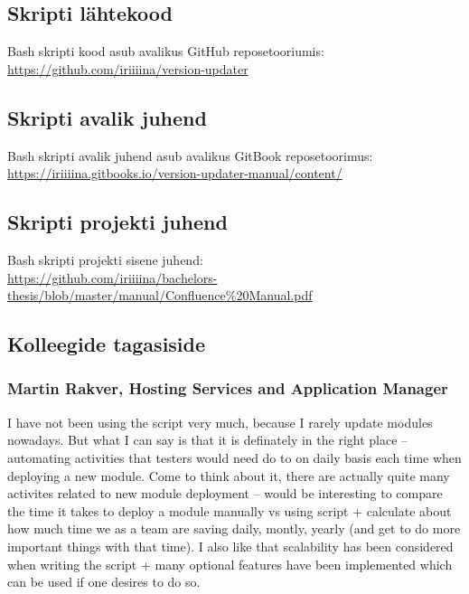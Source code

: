 \documentclass[12pt]{report}
\begin{document}
  \subsection{Skripti lähtekood}
  
  Bash skripti kood asub avalikus GitHub reposetooriumis:\\
  \url{https://github.com/iriiiina/version-updater}
  
  \subsection{Skripti avalik juhend}
  
  Bash skripti avalik juhend asub avalikus GitBook reposetoorimus:\\
  \url{https://iriiiina.gitbooks.io/version-updater-manual/content/}
  
  \subsection{Skripti projekti juhend}
  
  Bash skripti projekti sisene juhend:\\
  \url{https://github.com/iriiiina/bachelors-thesis/blob/master/manual/Confluence%20Manual.pdf}
  
  \subsection{Kolleegide tagasiside}
  
  \subsubsection{Martin Rakver, Hosting Services and Application Manager}
  
  I have not been using the script very much, because I rarely update modules nowadays. But what I can say is that it is definately in the right place – automating activities that testers would need do to on daily basis each time when deploying a new module. Come to think about it, there are actually quite many activites related to new module deployment – would be interesting to compare the time it takes to deploy a module manually vs using script + calculate about how much time we as a team are saving daily, montly, yearly (and get to do more important things with that time).
I also like that scalability has been considered when writing the script + many optional features have been implemented which can be used if one desires to do so.
\end{document}
